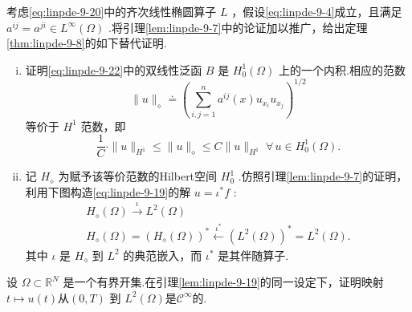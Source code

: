 \begin{rbhw}
考虑\eqref{eq:linpde-9-20}中的齐次线性椭圆算子 $L$ ，假设\eqref{eq:linpde-9-4}成立，且满足 ${a}^{ij} = {a}^{ji} \in  {L}^{\infty }\left( \Omega \right)$ .将引理\ref{lem:linpde-9-7}中的论证加以推广，给出定理\ref{thm:linpde-9-8}的如下替代证明.
\begin{enumerate}[(i)]
    \item 证明\eqref{eq:linpde-9-22}中的双线性泛函 $B$ 是 ${H}_{0}^{1}\left( \Omega \right)$ 上的一个内积.相应的范数
\[
\| u{\| }_{\diamond } \doteq  {\left( \sum_{{i,j = 1}}^{n}{a}^{ij}\left( x\right) {u}_{{x}_{i}}{u}_{{x}_{j}}\right) }^{1/2}
\]
等价于 ${H}^{1}$ 范数，即
\[
\frac{1}{C} \cdot  \| u{\| }_{{H}^{1}} \leq  \| u{\| }_{\diamond } \leq  C\| u{\| }_{{H}^{1}}\;\forall\,u \in  {H}_{0}^{1}\left( \Omega \right) .
\]
    \item 记 ${H}_{\diamond }$ 为赋予该等价范数的Hilbert空间 ${H}_{0}^{1}$ .仿照引理\ref{lem:linpde-9-7}的证明，利用下图构造\eqref{eq:linpde-9-19}的解 $u = {\iota }^{ * }f$ :
    \begin{gather*}
        {H}_{\diamond }\left( \Omega \right) \overset{\iota }{ \rightarrow  }{L}^{2}\left( \Omega \right)\\
        {H}_{\diamond }\left( \Omega \right)  = {\left(  {H}_{\diamond }\left( \Omega \right) \right)  }^{ * }\overset{{\iota }^{ * }}{ \leftarrow  }{\left(  {L}^{2}\left( \Omega \right) \right)  }^{ * } = {L}^{2}\left( \Omega \right) .
    \end{gather*}
其中 $\iota$ 是 ${H}_{\diamond }$ 到 ${L}^{2}$ 的典范嵌入，而 ${\iota }^{ * }$ 是其伴随算子.
\end{enumerate}
\end{rbhw}

\begin{rbhw}
设 $\Omega  \subset  {\mathbb{R}}^{N}$ 是一个有界开集.在引理\ref{lem:linpde-9-19}的同一设定下，证明映射 $t \mapsto  u\left( t\right)$从$(0,T)$ 到 ${L}^{2}\left( \Omega \right)$是${\mathcal{C}}^{\infty }$的.
\end{rbhw}

